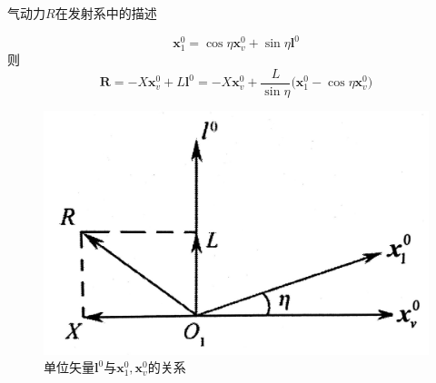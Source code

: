 \noa[4] 气动力$R$在发射系中的描述

\begin{equation}
	\bm{x}_1^0 = \cos \eta \bm{x}_v^0 + \sin \eta \bm{l}^0
\end{equation}
则
\begin{equation}
	\bm{R} = - X \bm{x}_v^0 + L \bm{l}^0 = - X\bm{x}_v^0 + \dfrac{L}{\sin \eta}\big(\bm{x}_1^0 - \cos \eta \bm{x}_v^0\big)
\end{equation}
\begin{figure}[!htb]
	\centering
	\includegraphics[width=0.4\linewidth]{pic/总气动力.jpg}
	\caption{单位矢量$\bm{l}^0$与$\bm{x}_1^0, \bm{x}_v^0$的关系}
\end{figure}

